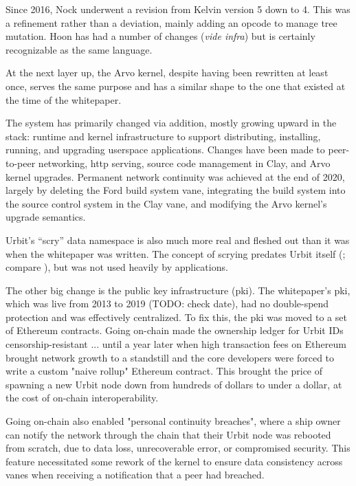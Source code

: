 \documentclass[twoside]{article}
\begin{document}
Since 2016, Nock underwent a revision from Kelvin version 5 down to 4.  This was a refinement rather than a deviation, mainly adding an opcode to manage tree mutation.  Hoon has had a number of changes (\emph{vide infra}) but is certainly recognizable as the same language.

At the next layer up, the Arvo kernel, despite having been rewritten at least once, serves the same purpose and has a similar shape to the one that existed at the time of the whitepaper.

The system has primarily changed via addition, mostly growing upward in the stack: runtime and kernel infrastructure to support distributing, installing, running, and upgrading userspace applications.  Changes have been made to peer-to-peer networking, {\sc http} serving, source code management in Clay, and Arvo kernel upgrades.  Permanent network continuity was achieved at the end of 2020, largely by deleting the Ford build system vane, integrating the build system into the source control system in the Clay vane, and modifying the Arvo kernel's upgrade semantics.

Urbit's ``scry'' data namespace is also much more real and fleshed out than it was when the whitepaper was written.  The concept of scrying predates Urbit itself (\citet{Yarvin2006a}; compare \citet{Yarvin2010}), but was not used heavily by applications.

The other big change is the public key infrastructure ({\sc pki}).  The whitepaper's {\sc pki}, which was live from 2013 to 2019 (TODO: check date), had no double-spend protection and was effectively centralized.  To fix this, the {\sc pki} was moved to a set of Ethereum contracts.  Going on-chain made the ownership ledger for Urbit IDs censorship-resistant ... until a year later when high transaction fees on Ethereum brought network growth to a standstill and the core developers were forced to write a custom "naive rollup" Ethereum contract.  This brought the price of spawning a new Urbit node down from hundreds of dollars to under a dollar, at the cost of on-chain interoperability.

Going on-chain also enabled "personal continuity breaches", where a ship owner can notify the network through the chain that their Urbit node was rebooted from scratch, due to data loss, unrecoverable error, or compromised security.  This feature necessitated some rework of the kernel to ensure data consistency across vanes when receiving a notification that a peer had breached.
\end{document}
